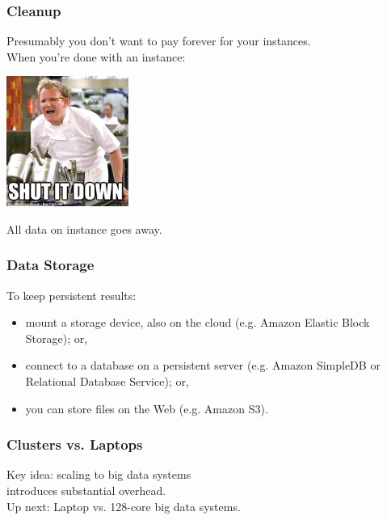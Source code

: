 \begin{frame}
  \frametitle{Cleanup}

  
Presumably you don't want to pay forever for your instances.\\[1em]

When you're done with an instance:

\begin{center}
	\includegraphics[width=0.3\textwidth]{images/shutitdown.jpg}
\end{center}


All data on instance goes away.
  
\end{frame}


\begin{frame}
  \frametitle{Data Storage}
  
To keep persistent results:
\begin{itemize}
\item mount a storage device,
also on the cloud (e.g. Amazon Elastic Block Storage); or, 
\item connect to a database on a persistent server (e.g. Amazon SimpleDB or
Relational Database Service); or, 
\item you can store files on the Web (e.g. Amazon S3). 
\end{itemize}
  
\end{frame}


\begin{frame}
\frametitle{Clusters vs. Laptops}


\begin{changemargin}{1cm}
Key idea: scaling to big data systems \\
introduces substantial overhead. \\[1em]
Up next: Laptop vs. 128-core big data systems.
\end{changemargin}

\end{frame}



